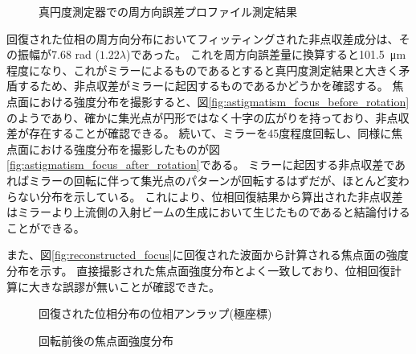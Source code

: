 \begin{figure}[!ht]
\centering
{}
\caption[]{真円度測定器での周方向誤差プロファイル測定結果}
\label{fig:roundness_error}
\end{figure}

回復された位相の周方向分布においてフィッティングされた非点収差成分は、その振幅が7.68 rad ($1.22\lambda$)であった。
これを周方向誤差量に換算すると\SI{101.5}{\micro \metre}程度になり、これがミラーによるものであるとすると真円度測定結果と大きく矛盾するため、非点収差がミラーに起因するものであるかどうかを確認する。
焦点面における強度分布を撮影すると、図\ref{fig:astigmatism_focus_before_rotation}のようであり、確かに集光点が円形ではなく十字の広がりを持っており、非点収差が存在することが確認できる。
続いて、ミラーを45度程度回転し、同様に焦点面における強度分布を撮影したものが図\ref{fig:astigmatism_focus_after_rotation}である。
ミラーに起因する非点収差であればミラーの回転に伴って集光点のパターンが回転するはずだが、ほとんど変わらない分布を示している。
これにより、位相回復結果から算出された非点収差はミラーより上流側の入射ビームの生成において生じたものであると結論付けることができる。

また、図\ref{fig:reconstructed_focus}に回復された波面から計算される焦点面の強度分布を示す。
直接撮影された焦点面強度分布とよく一致しており、位相回復計算に大きな誤謬が無いことが確認できた。


\begin{figure}[!ht]
\centering
{}
\caption[]{回復された位相分布の位相アンラップ(極座標)}
\label{fig:astigmatism_analysis}
\end{figure}


\begin{figure}[!ht]
\centering
{}
\caption[]{回転前後の焦点面強度分布}
\label{fig:darkflame_deviation_stat}
\end{figure}


